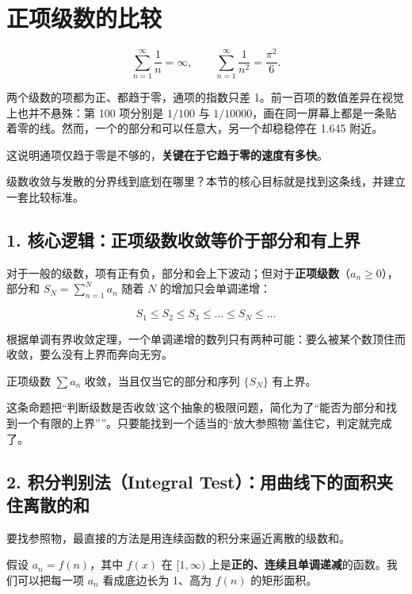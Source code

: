 \section{正项级数的比较}
\label{sec:02-Calculus/05-Sequences-and-Series/03}

\[
\sum_{n=1}^{\infty}\frac1n=\infty,
\qquad
\sum_{n=1}^{\infty}\frac1{n^2}=\frac{\pi^2}{6}.
\]

两个级数的项都为正、都趋于零，通项的指数只差 1。前一百项的数值差异在视觉上也并不悬殊：第 100 项分别是 \(1/100\) 与 \(1/10000\)，画在同一屏幕上都是一条贴着零的线。然而，一个的部分和可以任意大，另一个却稳稳停在 1.645 附近。

这说明通项仅趋于零是不够的，\textbf{关键在于它趋于零的速度有多快}。

级数收敛与发散的分界线到底划在哪里？本节的核心目标就是找到这条线，并建立一套比较标准。

\subsection{1. 核心逻辑：正项级数收敛等价于部分和有上界}

对于一般的级数，项有正有负，部分和会上下波动；但对于\textbf{正项级数}（\(a_n \ge 0\)），部分和 \(S_N = \sum_{n=1}^N a_n\) 随着 \(N\) 的增加只会单调递增：

\[
S_1 \le S_2 \le S_3 \le \dots \le S_N \le \dots
\]

根据单调有界收敛定理，一个单调递增的数列只有两种可能：要么被某个数顶住而收敛，要么没有上界而奔向无穷。

\begin{proposition}
正项级数 \(\sum a_n\) 收敛，当且仅当它的部分和序列 \(\{S_N\}\) 有上界。
\end{proposition}

这条命题把``判断级数是否收敛'这个抽象的极限问题，简化为了``能否为部分和找到一个有限的上界''''。只要能找到一个适当的``放大参照物'盖住它，判定就完成了。

\subsection{2. 积分判别法（Integral Test）：用曲线下的面积夹住离散的和}

要找参照物，最直接的方法是用连续函数的积分来逼近离散的级数和。

假设 \(a_n = f(n)\)，其中 \(f(x)\) 在 \([1, \infty)\) 上是\textbf{正的、连续且单调递减}的函数。我们可以把每一项 \(a_n\) 看成底边长为 1、高为 \(f(n)\) 的矩形面积。

